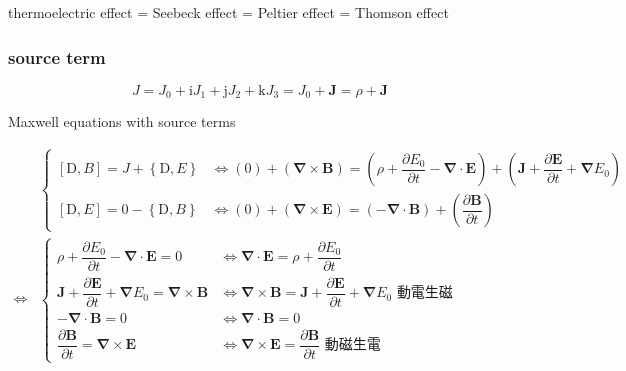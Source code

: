 \documentclass[
]{book}
\theoremstyle{definition}
\theoremstyle{definition}
\theoremstyle{definition}
\theoremstyle{definition}
\theoremstyle{remark}
\begin{document}
thermoelectric effect = Seebeck effect = Peltier effect = Thomson effect

\hypertarget{source-term}{%
\subsubsection{source term}\label{source-term}}

\[
J=J_{{\scriptscriptstyle 0}}+\mathrm{i}J_{{\scriptscriptstyle 1}}+\mathrm{j}J_{{\scriptscriptstyle 2}}+\mathrm{k}J_{{\scriptscriptstyle 3}}=J_{{\scriptscriptstyle 0}}+\boldsymbol{J}=\rho+\boldsymbol{J}
\]

Maxwell equations with source terms

\begin{CJK}{UTF8}{bsmi}
$$
\begin{aligned}
 & \begin{cases}
\left[\mathrm{D},B\right]=J+\left\{ \mathrm{D},E\right\}  & \Leftrightarrow\left(0\right)+\left(\boldsymbol{\nabla}\times\boldsymbol{B}\right)=\left(\rho+\dfrac{\partial E_{{\scriptscriptstyle 0}}}{\partial t}-\boldsymbol{\nabla}\cdot\boldsymbol{E}\right)+\left(\boldsymbol{J}+\dfrac{\partial\boldsymbol{E}}{\partial t}+\boldsymbol{\nabla}E_{{\scriptscriptstyle 0}}\right)\\
\left[\mathrm{D},E\right]=0-\left\{ \mathrm{D},B\right\}  & \Leftrightarrow\left(0\right)+\left(\boldsymbol{\nabla}\times\boldsymbol{E}\right)=\left(-\boldsymbol{\nabla}\cdot\boldsymbol{B}\right)+\left(\dfrac{\partial\boldsymbol{B}}{\partial t}\right)
\end{cases}\\
\Leftrightarrow & \begin{cases}
\rho+\dfrac{\partial E_{{\scriptscriptstyle 0}}}{\partial t}-\boldsymbol{\nabla}\cdot\boldsymbol{E}=0 & \Leftrightarrow\boldsymbol{\nabla}\cdot\boldsymbol{E}=\rho+\dfrac{\partial E_{{\scriptscriptstyle 0}}}{\partial t}\\
\boldsymbol{J}+\dfrac{\partial\boldsymbol{E}}{\partial t}+\boldsymbol{\nabla}E_{{\scriptscriptstyle 0}}=\boldsymbol{\nabla}\times\boldsymbol{B} & \Leftrightarrow\boldsymbol{\nabla}\times\boldsymbol{B}=\boldsymbol{J}+\dfrac{\partial\boldsymbol{E}}{\partial t}+\boldsymbol{\nabla}E_{{\scriptscriptstyle 0}}\text{ 動電生磁}\\
-\boldsymbol{\nabla}\cdot\boldsymbol{B}=0 & \Leftrightarrow\boldsymbol{\nabla}\cdot\boldsymbol{B}=0\\
\dfrac{\partial\boldsymbol{B}}{\partial t}=\boldsymbol{\nabla}\times\boldsymbol{E} & \Leftrightarrow\boldsymbol{\nabla}\times\boldsymbol{E}=\dfrac{\partial\boldsymbol{B}}{\partial t}\text{ 動磁生電}
\end{cases}
\end{aligned}
$$
\end{CJK}
\end{document}
